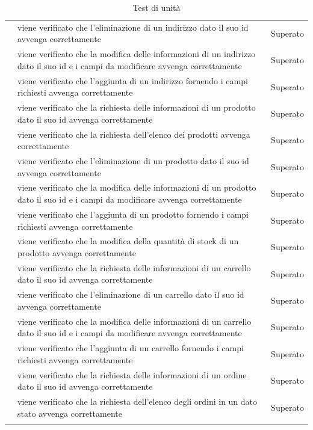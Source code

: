 \begin{center}
\begin{longtable}{|p{1cm}|p{11cm}|p{3cm}|}
		 & viene verificato che l'eliminazione di un indirizzo dato il suo id avvenga correttamente & Superato \\
		 & viene verificato che la modifica delle informazioni di un indirizzo dato il suo id e i campi da modificare avvenga correttamente & Superato \\
		 & viene verificato che l'aggiunta di un indirizzo fornendo i campi richiesti avvenga correttamente & Superato \\
		 & viene verificato che la richiesta delle informazioni di un prodotto dato il suo id avvenga correttamente & Superato \\
		 & viene verificato che la richiesta dell'elenco dei prodotti avvenga correttamente & Superato \\
		 & viene verificato che l'eliminazione di un prodotto dato il suo id avvenga correttamente & Superato \\
		 & viene verificato che la modifica delle informazioni di un prodotto dato il suo id e i campi da modificare avvenga correttamente & Superato \\
		 & viene verificato che l'aggiunta di un prodotto fornendo i campi richiesti avvenga correttamente & Superato \\
		 & viene verificato che la modifica della quantità di stock di un prodotto avvenga correttamente & Superato \\
		 & viene verificato che la richiesta delle informazioni di un carrello dato il suo id avvenga correttamente & Superato \\
		 & viene verificato che l'eliminazione di un carrello dato il suo id avvenga correttamente & Superato \\
		 & viene verificato che la modifica delle informazioni di un carrello dato il suo id e i campi da modificare avvenga correttamente & Superato \\
		 & viene verificato che l'aggiunta di un carrello fornendo i campi richiesti avvenga correttamente & Superato \\
		 & viene verificato che la richiesta delle informazioni di un ordine dato il suo id avvenga correttamente & Superato \\
		 & viene verificato che la richiesta dell'elenco degli ordini in un dato stato avvenga correttamente & Superato \\

		
		\hline
		\rowcolor{white}
		\caption{Test di unità}
	\end{longtable}
\end{center}
